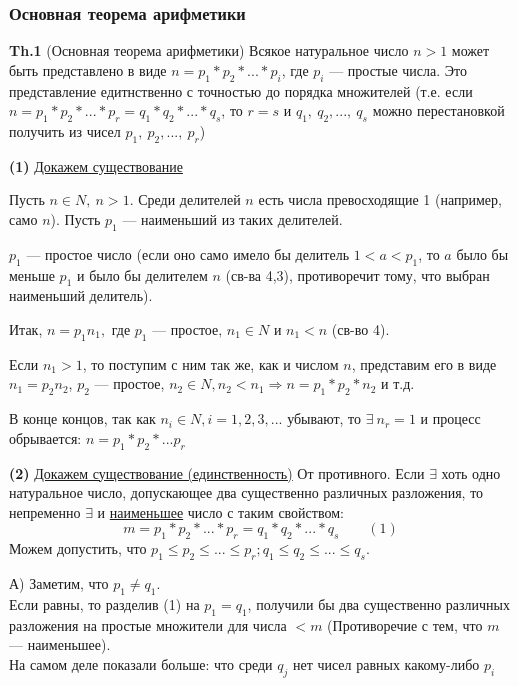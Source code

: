 \documentclass{article}
\begin{document}
  \subsubsection{Основная теорема арифметики}
  \textbf{Th.1} (Основная теорема арифметики) Всякое натуральное число \( n > 1 \) может быть представлено в виде \( n = p_1*p_2* ... *p_i \), где \( p_i \) --- простые числа. Это представление едитнственно с точностью до порядка множителей (т.е. если \( n = p_1*p_2*...*p_r = q_1*q_2*...*q_s \), то \( r = s \) и \(q_1,\ q_2,...,\ q_s \) можно перестановкой получить из чисел \( p_1,\ p_2,...,\ p_r \))

  \textbf{(1)} \underline{Докажем существование} 

  Пусть \(n \in N,\ n > 1 \). Среди делителей \( n \) есть числа превосходящие 1 (например, само \( n \)). Пусть \( p_1 \) --- наименьший из таких делителей.

  \( p_1 \) --- простое число (если оно само имело бы делитель \( 1 < a < p_1 \), то \( a \) было бы меньше \( p_1 \) и было бы делителем \( n \) (св-ва 4,3), противоречит тому, что выбран наименьший делитель).

  Итак, \( n = p_1n_1, \textrm{ где } p_1 \textrm{ --- простое, } n_1 \in N \textrm{ и } n_1 < n \) (св-во 4).

  Если \( n_1 > 1 \), то поступим с ним так же, как и числом \( n \), представим его в виде \( n_1 = p_2n_2 \), \( p_2 \) --- простое, \( n_2 \in N, n_2 < n_1 \Rightarrow n = p_1*p_2*n_2 \) и т.д.

  В конце концов, так как \( n_i \in N, i=1,2,3,... \) убывают, то \( \exists\ n_r = 1 \) и процесс обрывается: \( n=p_1*p_2*...p_r \)

  \textbf{(2)} \underline{Докажем существование (единственность)}
  От противного. Если \( \exists \) хоть одно натуральное число, допускающее два существенно различных разложения, то непременно \( \exists \) и \underline{наименьшее} число с таким свойством: \[ m = p_1*p_2*...*p_r = q_1*q_2*...*q_s \qquad (1) \]
  Можем допустить, что \( p_1 \leq p_2 \leq ... \leq p_r; q_1 \leq q_2 \leq ... \leq q_s \).

  А) Заметим, что \( p_1 \neq q_1 \).\\
  Если равны, то разделив (1) на \( p_1 = q_1 \), получили бы два существенно различных разложения на простые множители для числа \( < m \) (Противоречие с тем, что \( m \) --- наименьшее).\\
  На самом деле показали больше: что среди \( q_j \) нет чисел равных какому-либо \( p_i \)
\end{document}
